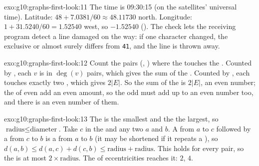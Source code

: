 \begin{solution}{exo:g10:graphs-first-look:11}
The time is 09:30:15 (on the satellites' universal time). Latitude: $48 + 7.0381/60 \approx 48.11730$  north.
Longitude: $1 + 31.5240/60 = 1.52540$  west, so $-1.52540$ (). The check lets the
receiving program detect a line damaged on the way: if one character changed, the exclusive or almost surely
differs from \texttt{41}, and the line is thrown away.
\end{solution}

\begin{solution}{exo:g10:graphs-first-look:12}
Count the pairs (, ) where the  touches the . Counted by , each  $v$ is in
$\deg(v)$ pairs, which gives the sum of the . Counted by , each  touches exactly two , which
gives $2|E|$. So the sum of the  is $2|E|$, an even number; the  of even  add an even amount,
so the odd  must add up to an even number too, and there is an even number of them.
\end{solution}

\begin{solution}{exo:g10:graphs-first-look:13}
The  is the smallest  and the  the largest, so $\text{radius} \le \text{diameter}$. Take
$c$ in the  and any two  $a$ and $b$. A  from $a$ to $c$ followed by a  from $c$ to $b$ is a
 from $a$ to $b$ (it may be shortened if it repeats a ), so
$d(a, b) \le d(a, c) + d(c, b) \le \text{radius} + \text{radius}$. This holds for every pair, so the  is at
most $2 \times \text{radius}$. The  of eccentricities reaches it:  $2$,  $4$.
\end{solution}

